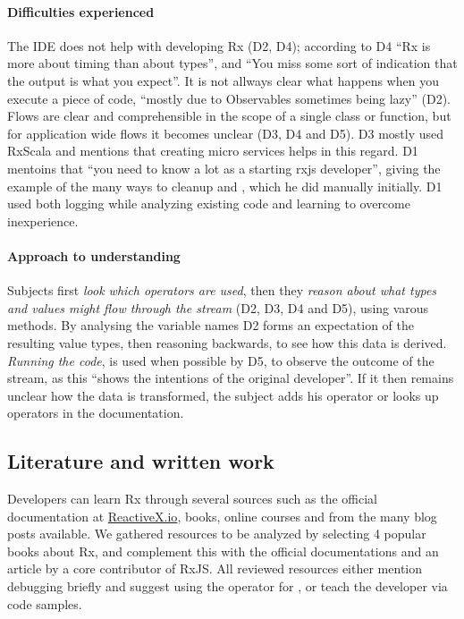 \paragraph{Difficulties experienced}
The IDE does not help with developing Rx (D2, D4); according to D4 ``Rx is more about timing than about types'', and ``You miss some sort of indication that the output is what you expect''. It is not allways clear what happens when you execute a piece of code, ``mostly due to Observables sometimes being lazy'' (D2).
Flows are clear and comprehensible in the scope of a single class or function, but for application wide flows it becomes unclear (D3, D4 and D5). D3 mostly used RxScala and mentions that creating micro services helps in this regard.
D1 mentoins that ``you need to know a lot as a starting {\lbrack}rxjs{\rbrack} developer'', giving the example of the many ways to cleanup and , which he did manually initially. D1 used both logging while analyzing existing code and learning to overcome inexperience.

\paragraph{Approach to understanding}
Subjects first \emph{look which operators are used},
then they \emph{reason about what types and values might flow through the stream} (D2, D3, D4 and D5), using varous methods.
By analysing the variable names D2 forms an expectation of the resulting value types, then reasoning backwards, to see how this data is derived.
\emph{Running the code}, is used when possible by D5, to observe the outcome of the stream, as this ``shows the intentions of the original developer''.
If it then remains unclear how the data is transformed, the subject adds his  operator or looks up operators in the documentation.  

\subsection{Literature and written work}
Developers can learn Rx through several sources such as the official documentation at \href{http://reactivex.io}{ReactiveX.io}, books, online courses and from the many blog posts available. We gathered resources to be analyzed by selecting 4 popular books about Rx, and complement this with the official documentations and an article by a core contributor of RxJS.
All reviewed resources either mention debugging briefly and suggest using the  operator for \printfdebugging{}, or teach the developer \printfdebugging{} via code samples. 

